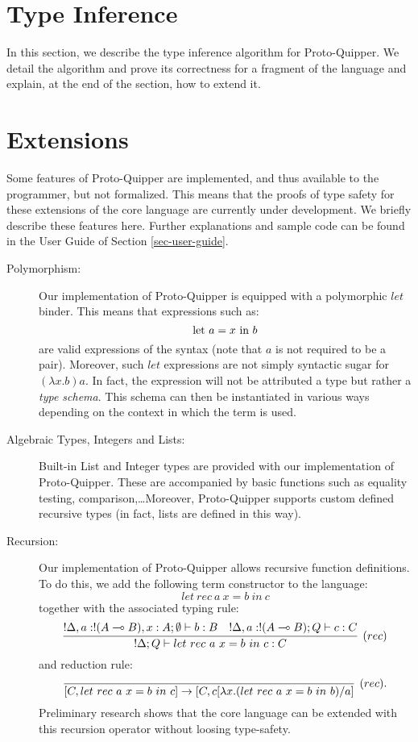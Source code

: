 \documentclass{article}
\begin{document}
\section{Type Inference}

In this section, we describe the type inference algorithm 
for Proto-Quipper. We detail the algorithm and prove its 
correctness for a fragment of the language and explain, 
at the end of the section, how to extend it.




\section{Extensions}
\label{sec-extensions}

Some features of Proto-Quipper are implemented, and thus available 
to the programmer, but not formalized. This means that the proofs 
of type safety for these extensions of the core language are 
currently under development. We briefly describe these features 
here. Further explanations and sample code can be found in the 
User Guide of Section \ref{sec-user-guide}.
\begin{description}
  \item[Polymorphism:] Our implementation of Proto-Quipper is 
    equipped with a polymorphic $let$ binder. This means that 
    expressions such as:
    \[
    \text{let}~ a = x ~\text{in}~ b
    \]
    are valid expressions of the syntax (note that $a$ is not required 
    to be a pair). Moreover, such $let$ expressions are not simply 
    syntactic sugar for $(\lambda x.b)a$. In fact, the expression
    will not be attributed a type but rather a \emph{type schema}.
    This schema can then be instantiated in various ways depending 
    on the context in which the term is used. 
  \item[Algebraic Types, Integers and Lists:] Built-in List and 
    Integer types are provided with our implementation of Proto-Quipper.
    These are accompanied by basic functions such as equality testing, 
    comparison,\ldots Moreover, Proto-Quipper supports custom defined
    recursive types (in fact, lists are defined in this way).
  \item[Recursion:] Our implementation of Proto-Quipper allows 
    recursive function definitions. To do this, we add the following 
    term constructor to the language:
    \[
    let~rec~ a ~x = b~ in~ c
    \]    
    together with the associated typing rule:
    \[
    \infer[(rec)]{!\Delta;Q \entails let~rec~ a ~x = b~ in~ c:C}{
      !\Delta,a:!(A\loli B), x:A;\emptyset \entails b:B
      &
      !\Delta, a:!(A\loli B) ;Q \entails c:C      
    }
    \]
    and reduction rule:
    \[
    \infer[(rec).]{[C,let~rec~ a ~x = b~ in~ c]\to [C, c[\lambda x.(let~rec~ a ~x = b~ in~ b)/a]}{}
    \]
    Preliminary research shows that the core language can be extended 
    with this recursion operator without loosing type-safety. 
\end{description}
\end{document}
